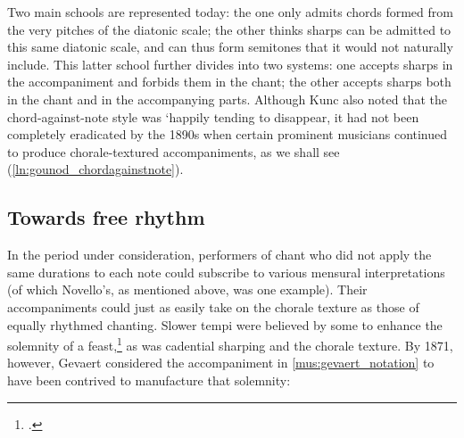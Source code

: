  {\cite[p.~32, p.~34 n~.1, pp.~41, 43]{RuellecongreseuropeenArezzo1884}}
{Two main schools are represented today: the one only admits chords formed from the very pitches of the diatonic scale; the other thinks sharps can be admitted to this same diatonic scale, and can thus form semitones that it would not naturally include. This latter school further divides into two systems: one accepts sharps in the accompaniment and forbids them in the chant; the other accepts sharps both in the chant and in the accompanying parts.}
\noindent
Although Kunc also noted that the chord-against-note style was `happily tending to disappear, it had not been completely eradicated by the 1890s when certain prominent musicians continued to produce chorale-textured accompaniments, as we shall see (\cref{ln:gounod_chordagainstnote}).

\subsection{Towards free rhythm}
In the period under consideration, performers of chant who did not apply the same durations to each note could subscribe to various mensural interpretations (of which Novello's, as mentioned above, was one example).
Their accompaniments could just as easily take on the chorale texture as those of equally rhythmed chanting.
Slower tempi were believed by some to enhance the solemnity of a feast,\footcite[137]{MannaertsGevaertStudyPlainchant2010} as was cadential sharping and the chorale texture.
By 1871, however, Gevaert considered the accompaniment in \cref{mus:gevaert_notation} to have been contrived to manufacture that solemnity:

